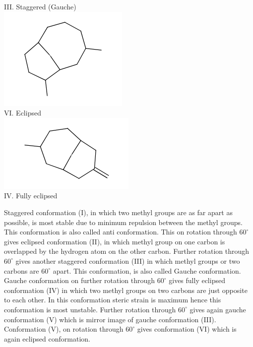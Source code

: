 \documentclass[10pt]{article}
\begin{document}
III. Staggered (Gauche)\\
\includegraphics{smile-c74853f165165aad0eac5545befa0fc4f9141cd9}\\
VI. Eclipsed\\
\includegraphics{smile-54eff5e52e019791d83541f46166dfe3c2ea3b9d}\\
IV. Fully eclipsed

Staggered conformation (I), in which two methyl groups are as far apart as possible, is most stable due to minimum repulsion between the methyl groups. This conformation is also called anti conformation. This on rotation through $60^{\circ}$ gives eclipsed conformation (II), in which methyl group on one carbon is overlapped by the hydrogen atom on the other carbon. Further rotation through $60^{\circ}$ gives another staggered conformation (III) in which methyl groups or two carbons are $60^{\circ}$ apart. This conformation, is also called Gauche conformation. Gauche conformation on further rotation through $60^{\circ}$ gives fully eclipsed conformation (IV) in which two methyl groups on two carbons are just opposite to each other. In this conformation steric strain is maximum hence this conformation is most unstable. Further rotation through $60^{\circ}$ gives again gauche conformation (V) which is mirror image of gauche conformation (III). Conformation (V), on rotation through $60^{\circ}$ gives conformation (VI) which is again eclipsed conformation.
\end{document}
